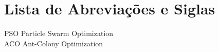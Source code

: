 \chapter*{Lista de Abreviações e Siglas}


PSO \hspace{2cm} Particle Swarm Optimization \\

ACO \hspace{2cm} Ant-Colony Optimization

%

